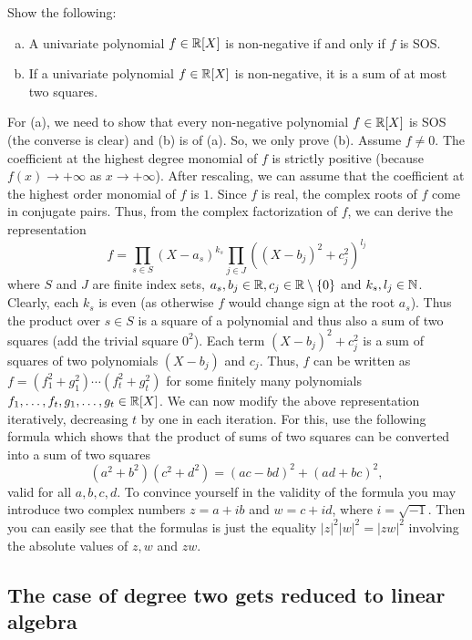 \begin{exercise}
	\label{univariate}
	Show the following: 
	\begin{enumerate}[(a)]
		\item A univariate polynomial $f \in \mathbb{R}[X]$ is non-negative if and only if $f$ is SOS. 
		\item If a univariate polynomial $f \in \mathbb{R}[X]$ is non-negative, it is a sum of at most two squares. 
	\end{enumerate}
\end{exercise}
\begin{solution}
	For (a), we need to show that every non-negative polynomial $f \in \mathbb{R}[X]$ is SOS (the converse is clear) and (b) is  of (a). So, we only prove (b). Assume $f \ne 0$. The coefficient at the highest degree monomial of $f$ is strictly positive (because $f(x) \to +\infty$ as $x\to +\infty$). After rescaling, we can assume that the coefficient at the highest order monomial of $f$ is $1$. Since $f$ is real, the complex roots of $f$ come in conjugate pairs. Thus, from the complex factorization of $f$, we can derive the representation 
	\[
		f = \prod_{s \in S} (X-a_s)^{k_s} \prod_{j \in J} ( (X-b_j)^2  + c_j^2)^{l_j}
	\]
	where $S$ and $J$ are finite index sets, $a_s, b_j \in \mathbb{R}, c_j \in \mathbb{R} \setminus \{0\}$ and $k_s,l_j \in \mathbb{N}$. Clearly, each $k_s$ is even (as otherwise $f$ would change sign at the root $a_s$). Thus the product over $s \in S$ is a square of a polynomial and thus also a sum of two squares (add the trivial square $0^2$). Each term $(X-b_j)^2 + c_j^2$ is a sum of squares of two polynomials $(X-b_j)$ and $c_j$. Thus, $f$ can be written as $f = (f_1^2 + g_1^2 ) \cdots (f_t^2 + g_t^2)$ for some finitely many polynomials $f_1,\ldots,f_t,g_1,\ldots,g_t \in \mathbb{R}[X]$. We can now modify the above representation iteratively, decreasing $t$ by one in each iteration. For this, use the following formula which shows that the product of sums of two squares can be converted into a sum of two squares
	\[
		(a^2 + b^2) (c^2 + d^2) = (ac - bd)^2 + (ad + bc)^2,
	\]
	valid for all $a,b,c,d$. To convince yourself in the validity of the formula you may introduce two complex numbers $z = a + i b$ and $w = c + i d$, where $i=\sqrt{-1}$. Then you can easily see that the formulas is just the equality $|z|^2 |w|^2 = |zw|^2$ involving the absolute values of $z, w$ and $zw$. 
\end{solution}

\subsection{The case of degree two gets reduced to linear algebra} 

